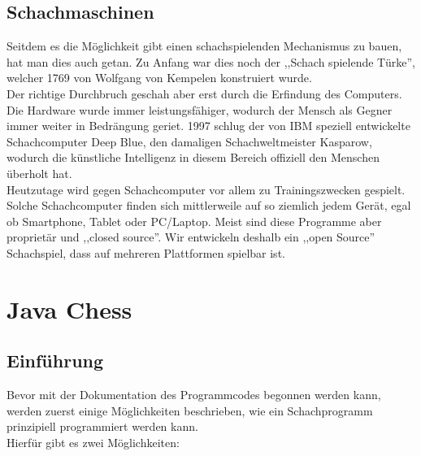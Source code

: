 \documentclass[12pt,a4paper]{article}
\begin{document}

\subsection{Schachmaschinen}
\label{SUBSUBSEC:CHESS-COMPUTERS}

Seitdem es die Möglichkeit gibt einen schachspielenden Mechanismus zu bauen, hat man dies auch getan. Zu Anfang war dies noch der ,,Schach spielende Türke'', welcher 1769 von Wolfgang von Kempelen konstruiert wurde. \cite{wiki:chess} \\ 
Der richtige Durchbruch geschah aber erst durch die Erfindung des Computers. Die Hardware wurde immer leistungsfähiger, wodurch der Mensch als Gegner immer weiter in Bedrängung geriet. 1997 schlug der von IBM speziell entwickelte Schachcomputer Deep Blue, den damaligen Schachweltmeister Kasparow, wodurch die künstliche Intelligenz in diesem Bereich offiziell den Menschen überholt hat. \\
Heutzutage wird gegen Schachcomputer vor allem zu Trainingszwecken gespielt. Solche Schachcomputer finden sich mittlerweile auf so ziemlich jedem Gerät, egal ob Smartphone, Tablet oder PC/Laptop. Meist sind diese Programme aber proprietär und ,,closed source''. Wir entwickeln deshalb ein ,,open Source'' Schachspiel, dass auf mehreren Plattformen spielbar ist.
 
\clearpage\vfill\newpage{}

\section{Java Chess}
\label{SEC:JAVACHESS}

\subsection{Einführung}
\label{SUBSEC:JAVACHESS-INTRO}

Bevor mit der Dokumentation des Programmcodes begonnen werden kann, werden zuerst einige Möglichkeiten beschrieben, wie ein Schachprogramm prinzipiell programmiert werden kann.\\
Hierfür gibt es zwei Möglichkeiten:
\end{document}
